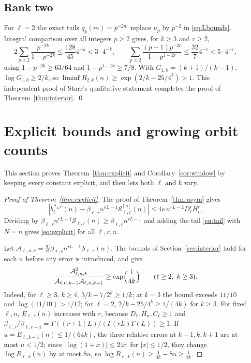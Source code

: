 \documentclass[11pt,a4paper]{article}
\theoremstyle{remark}
\numberwithin{equation}{section}
\newcommand{\Sing}{\mathcal S}
\newcommand{\Ac}{*_{\mathrm A}}
\begin{document}
\subsection{Rank two}
For $\ell=2$ the exact tails $q_p(m)=p^{-2m}$ replace $u_p$ by $p^{-2}$ in \eqref{eq:Lbounds}. Integral comparison over all integers $p\ge2$ gives, for $k\ge3$ and $r\ge2$,
\[
2\sum_{p\ge2}\frac{p^{-2k}}{1-p^{-2k}}\le\frac{128}{45}4^{-k}<3\cdot4^{-k},\qquad
\sum_{p\ge2}\frac{(p-1)p^{-2r}}{1-p^{1-2r}}\le\frac{32}7 4^{-r}<5\cdot4^{-r},
\]
using $1-p^{-2k}\ge63/64$ and $1-p^{1-2r}\ge7/8$. With $G_{1,k}=(k+1)/(k-1)$, $\log G_{1,k}\ge2/k$, so $\liminf R_{2,k}(n)\ge\exp(2/k-25/4^k)>1$. This independent proof of Starr's qualitative statement completes the proof of Theorem~\ref{thm:interior}. \qed

\section{Explicit bounds and growing orbit counts}\label{sec:uniform}

This section proves Theorem~\ref{thm:explicit} and Corollary~\ref{cor:window} by keeping every constant explicit, and then lets both $\ell$ and $k$ vary.

\begin{proof}[Proof of Theorem~\ref{thm:explicit}]
The proof of Theorem~\ref{thm:asym} gives \[|b_\ell^{\Ac r}(n)-\beta_{\ell,r}n^{rL-1}\Sing^{[n]}_{\ell,r}(n)|\le4e\,n^{rL-2}D_\ell^rH_n^r.\] Dividing by $\beta_{\ell,r}n^{rL-1}\Sing_{\ell,r}(n)\ge\beta_{\ell,r}n^{rL-1}$ and adding the tail \eqref{eq:tail} with $N=n$ gives \eqref{eq:explicit} for all $\ell,r,n$.

Let $\mathcal A_{\ell,n,r}=\frac{n!}{r!}\beta_{\ell,r}n^{rL-1}\Sing_{\ell,r}(n)$. The bounds of Section~\ref{sec:interior} hold for each $n$ before any error is introduced, and give
\begin{equation}\label{eq:mainratio}
\frac{\mathcal A_{\ell,n,k}^2}{\mathcal A_{\ell,n,k-1}\mathcal A_{\ell,n,k+1}}\ge\exp\Bigl(\frac1{4k}\Bigr)\qquad(\ell\ge2,\ k\ge3).
\end{equation}
Indeed, for $\ell\ge3$, $k\ge4$, $3/k-7/2^k\ge1/k$; at $k=3$ the bound exceeds $11/10$ and $\log(11/10)>1/12$; for $\ell=2$, $2/k-25/4^k\ge1/(4k)$ for $k\ge3$. For fixed $\ell,n$, $E_{\ell,r}(n)$ increases with $r$, because $D_\ell,H_n,C_\ell\ge1$ and $\beta_{\ell,r}/\beta_{\ell,r+1}=\Gamma((r+1)L)/(\Gamma(rL)\Gamma(L))\ge1$. If $u=E_{\ell,k+1}(n)\le1/(64k)$, the three relative errors at $k-1,k,k+1$ are at most $u<1/2$; since $|\log(1+x)|\le2|x|$ for $|x|\le1/2$, they change $\log R_{\ell,k}(n)$ by at most $8u$, so $\log R_{\ell,k}(n)\ge\frac1{4k}-8u\ge\frac1{8k}$.
\end{proof}
\end{document}
